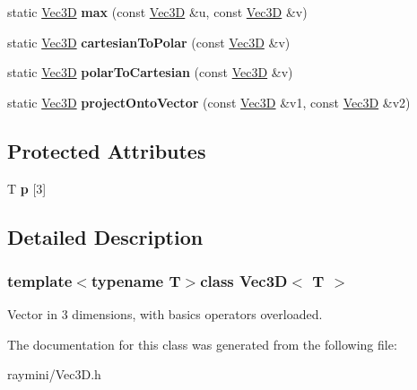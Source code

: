 \begin{DoxyCompactItemize}
\item 
\hypertarget{class_vec3_d_af1ceabd1161a6b3aa7894d8a09948691}{
static \hyperlink{class_vec3_d}{Vec3D} {\bfseries max} (const \hyperlink{class_vec3_d}{Vec3D} \&u, const \hyperlink{class_vec3_d}{Vec3D} \&v)}
\label{class_vec3_d_af1ceabd1161a6b3aa7894d8a09948691}

\item 
\hypertarget{class_vec3_d_a9e230f0533ac66d754006f449d20b75c}{
static \hyperlink{class_vec3_d}{Vec3D} {\bfseries cartesianToPolar} (const \hyperlink{class_vec3_d}{Vec3D} \&v)}
\label{class_vec3_d_a9e230f0533ac66d754006f449d20b75c}

\item 
\hypertarget{class_vec3_d_a21139d1b8165e623728a0978f8b5aa74}{
static \hyperlink{class_vec3_d}{Vec3D} {\bfseries polarToCartesian} (const \hyperlink{class_vec3_d}{Vec3D} \&v)}
\label{class_vec3_d_a21139d1b8165e623728a0978f8b5aa74}

\item 
\hypertarget{class_vec3_d_a855e0f40632837e720a88c0a2d5f420a}{
static \hyperlink{class_vec3_d}{Vec3D} {\bfseries projectOntoVector} (const \hyperlink{class_vec3_d}{Vec3D} \&v1, const \hyperlink{class_vec3_d}{Vec3D} \&v2)}
\label{class_vec3_d_a855e0f40632837e720a88c0a2d5f420a}

\end{DoxyCompactItemize}
\subsection*{Protected Attributes}
\begin{DoxyCompactItemize}
\item 
\hypertarget{class_vec3_d_a54e790b674e826e01bd5fda587fad0cb}{
T {\bfseries p} \mbox{[}3\mbox{]}}
\label{class_vec3_d_a54e790b674e826e01bd5fda587fad0cb}

\end{DoxyCompactItemize}


\subsection{Detailed Description}
\subsubsection*{template$<$typename T$>$class Vec3D$<$ T $>$}

Vector in 3 dimensions, with basics operators overloaded. 

The documentation for this class was generated from the following file:\begin{DoxyCompactItemize}
\item 
raymini/Vec3D.h\end{DoxyCompactItemize}
